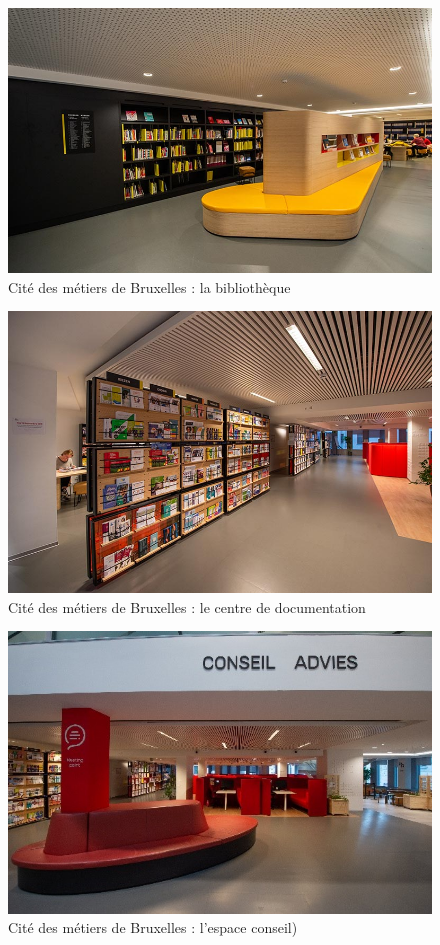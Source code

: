 \documentclass[french,a4paper,12pt]{article}
\begin{document}
{\begin{figure}
\caption{Cité des métiers de Bruxelles : la bibliothèque}
\includegraphics[scale=1]{2-cdm-bibliotheque.JPG}
\end{figure}
\begin{figure}
\caption{Cité des métiers de Bruxelles : le centre de documentation}
\includegraphics[scale=1]{3-cdm-centre_de_documentation.JPG}
\end{figure}
\begin{figure}
\caption{Cité des métiers de Bruxelles : l'espace conseil)}
\includegraphics[scale=0.9]{4-cdm-espace_conseil.JPG}

\end{figure}}
\end{document}
